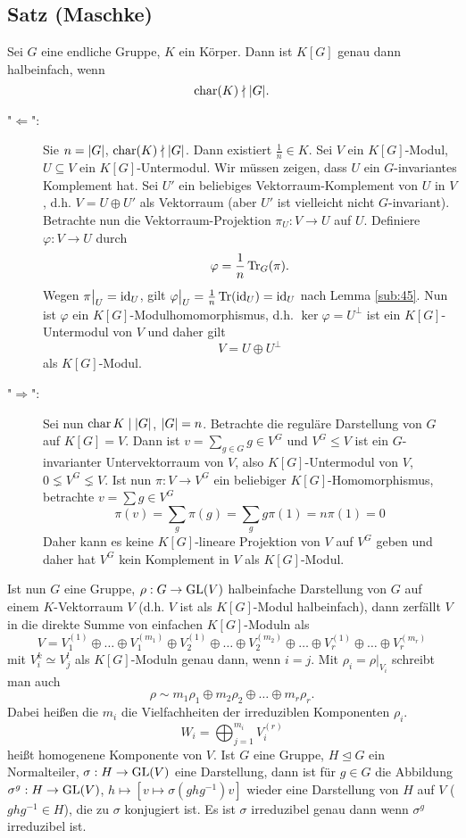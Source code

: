 \subsection{Satz (Maschke)} %
\label{sub:46}
Sei $G$ eine endliche Gruppe, $K$ ein Körper. Dann ist $K[G]$ genau dann halbeinfach, wenn 
\[
	\Char(K) \nmid \abs*{G}.
\]
\begin{description}
	\item["$\Leftarrow$":] Sie $n= \abs*{G}$, $\Char(K) \nmid \abs*{G}$. Dann existiert $\frac{1}{n} \in K$. Sei $V$ ein $K[G]$-Modul, $U \subseteq V$ ein $K[G]$-Untermodul.
	Wir müssen zeigen, dass $U$ ein $G$-invariantes Komplement hat. Sei $U'$ ein beliebiges Vektorraum-Komplement von $U$ in $V$, d.h. $V= U \oplus U'$ als Vektorraum (aber
	$U'$ ist vielleicht nicht $G$-invariant). Betrachte nun die Vektorraum-Projektion $\pi_U : V \to U$ auf $U$. Definiere $\varphi : V \to U$ durch
	\[
		\varphi = \frac{1}{n} \Tr_G(\pi) .
	\]
	Wegen $\pi\big|_U = \id_U$, gilt $\varphi\big|_{U} = \frac{1}{n} \Tr(\id_U) = \id_U$ nach Lemma \ref{sub:45}. Nun ist $\varphi$ ein $K[G]$-Modulhomomorphismus, d.h.
	$\ker \varphi = U^\bot$ ist ein $K[G]$-Untermodul von $V$ und daher gilt
	\[
		V = U \oplus  U^\bot
	\]
	als $K[G]$-Modul.
	\item["$\Rightarrow$":] Sei nun $\Char K \mid \abs*{G}$, $\abs*{G} = n$. Betrachte die reguläre Darstellung von $G$ auf $K[G]=V$. Dann ist $v = \sum_{g \in G} g \in V^G$
	und $V^G \le V$ ist ein $G$-invarianter Untervektorraum von $V$, also $K[G]$-Untermodul von $V$, $0 \lneq V^G \lneq V$. Ist nun $\pi : V \to V^G$ ein beliebiger 
	$K[G]$-Homomorphismus, betrachte $v= \sum g \in V^G$
	\[
		\pi(v) = \sum_g  \pi(g) = \sum_g g  \pi(1) = n \pi(1) = 0
	\]
	Daher kann es keine $K[G]$-lineare Projektion von $V$ auf $V^G$ geben und daher hat $V^G$ kein Komplement in $V$ als $K[G]$-Modul. \bewende 
\end{description}
Ist nun $G$ eine Gruppe, $\rho : G \to \GL(V)$ halbeinfache Darstellung von $G$ auf einem $K$-Vektorraum $V$ (d.h. $V$ ist als $K[G]$-Modul halbeinfach), dann zerfällt $
V$ in die direkte Summe von einfachen $K[G]$-Moduln als 
\[
	V = V_1^{(1)} \oplus \ldots \oplus V_1^{(m_1)} \oplus V_2^{(1)} \oplus \ldots \oplus V_2^{(m_2)} \oplus  \ldots  \oplus V_r^{(1)} \oplus \ldots \oplus V_r^{(m_r)}
\]
mit $V_i^{k} \simeq V_j^{l}$ als $K[G]$-Moduln genau dann, wenn $i=j$. Mit $\rho_i = \rho \big|_{V_i}$ schreibt man auch
\[
	\rho \sim m_1 \rho_1 \oplus m_2 \rho_2 \oplus \ldots \oplus m_r \rho_r.
\]
Dabei heißen die $m_i$ die Vielfachheiten der irreduziblen Komponenten $\rho_i$.
\[
	W_i = \bigoplus_{j=1}^{m_i} V_i^{(r)}
\]
heißt homogenene Komponente von $V$. Ist $G$ eine Gruppe, $H \unlhd G$ ein Normalteiler, $\sigma : H \to \GL(V)$ eine Darstellung, dann ist für $g \in G$ die 
Abbildung $\sigma^g : H \to \GL(V)$, $h \mapsto [v \mapsto \sigma(g h g ^{-1}) v]$ wieder eine Darstellung von $H$ auf $V$ ($g h g ^{-1} \in H$), die zu $\sigma$ 
konjugiert ist. Es ist $\sigma$ irreduzibel genau dann wenn $\sigma^g$ irreduzibel ist.

